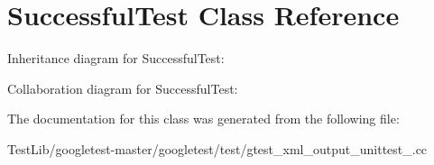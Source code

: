 \hypertarget{classSuccessfulTest}{}\section{Successful\+Test Class Reference}
\label{classSuccessfulTest}


Inheritance diagram for Successful\+Test\+:


Collaboration diagram for Successful\+Test\+:


The documentation for this class was generated from the following file\+:\begin{DoxyCompactItemize}
\item 
Test\+Lib/googletest-\/master/googletest/test/gtest\+\_\+xml\+\_\+output\+\_\+unittest\+\_\+.\+cc\end{DoxyCompactItemize}
